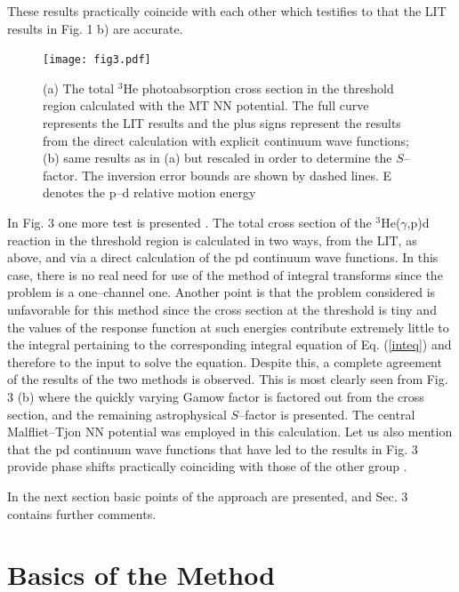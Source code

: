 \documentclass[12pt,ams,preprint,a4paper]{revtex4}
\begin{document}
These results practically coincide with each other which 
testifies to that the LIT results in Fig. 1 b) are 
accurate.

\begin{figure}
\centerline{\texttt{[image: fig3.pdf]}}
\caption{(a) The  total 
$^3$He photoabsorption cross section in the threshold region calculated with the MT NN potential. 
The full curve represents the LIT results and the plus signs represent the results from the direct calculation with explicit continuum
wave functions; (b) same results as in (a) but rescaled in order to determine the \mbox{$S$--factor}.  
The inversion error bounds are shown by dashed lines. E denotes the p--d relative motion energy}
\label{fig3}      
\end{figure}

In Fig. 3 one more test is presented \cite{wl}. 
The total cross section of the $^3$He($\gamma$,p)d reaction
in the threshold region is calculated in two ways, from the LIT, as above, and via a 
direct calculation of the pd continuum wave functions.  In this case, there is no real need for use
of the  method of integral transforms since the problem is a one--channel one. Another point is that the
problem considered is unfavorable for this method since the cross section at the threshold is tiny and  
the values of the response function at such energies 
contribute extremely little to the integral 
pertaining to 
the corresponding 
integral equation of Eq. (\ref{inteq}) and therefore to the input to solve the equation.   
Despite this, a 
complete agreement of the results of the two methods is observed. This is most 
clearly seen from Fig. 3 (b)
where the quickly varying Gamow factor is factored out 
from the cross section,  and the remaining astrophysical 
$S$--factor  is presented.  The central Malfliet--Tjon NN
potential was employed in this calculation. Let us also mention that the pd continuum 
wave functions that have led to the results in Fig. 3 provide phase shifts practically coinciding 
with those of the other group \cite{Kie16}.   
 
In  the next section basic points of the approach are presented, and Sec. 3 contains further comments.

\section{Basics of the Method}
\end{document}
